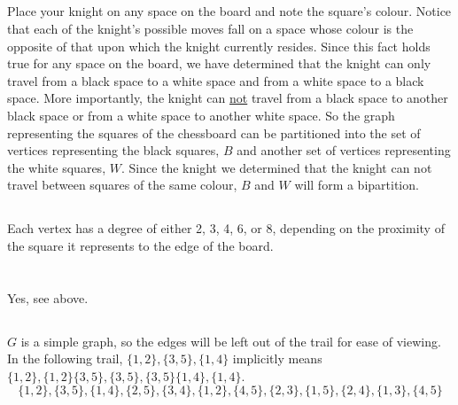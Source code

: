 \documentclass{article}
\begin{document}
\subsection{}
Place your knight on any space on the board and note the square's colour. Notice that each of the knight's possible moves fall on a space whose colour
is the opposite of that upon which the knight currently resides. Since this fact holds true for any space on the board, we have determined that the
knight can only travel from a black space to a white space and from a white space to a black space. More importantly, the knight can \underline{not}
travel from a black space to another black space or from a white space to another white space. So the graph representing the squares of the chessboard
can be partitioned into the set of vertices representing the black squares, $B$ and another set of vertices representing the white squares, $W$. Since the knight
we determined that the knight can not travel between squares of the same colour, $B$ and $W$ will form a bipartition.
\subsection{}
Each vertex has a degree of either 2, 3, 4, 6, or 8, depending on the proximity of the square it represents to the edge of the board.

\section{} %
\subsection{}

\subsection{}
Yes, see above.
\subsection{}
$G$ is a simple graph, so the edges will be left out of the trail for ease of viewing.
In the following trail, $\{1,2\},\{3,5\},\{1,4\}$ implicitly means $\{1,2\},\{1,2\}\{3,5\},\{3,5\},\{3,5\}\{1,4\},\{1,4\}$.
\[\{1,2\},\{3,5\},\{1,4\},\{2,5\},\{3,4\},\{1,2\},\{4,5\},\{2,3\},\{1,5\},\{2,4\},\{1,3\},\{4,5\}\]
\end{document}
